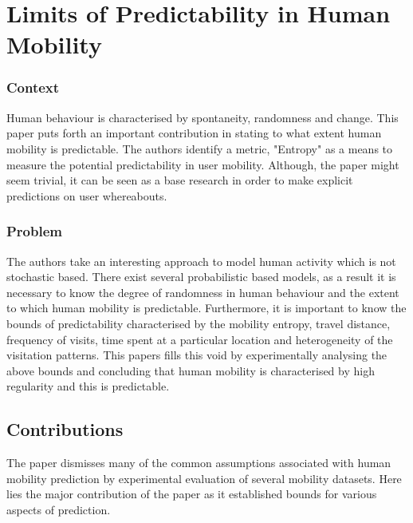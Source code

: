 \newpage
\section{Limits of Predictability in Human Mobility~\cite{Song1018}} \label{lect1}

\subsubsection*{Context}

Human behaviour is characterised by spontaneity, randomness and change. This paper puts
forth an important contribution in stating to what extent human mobility is predictable. 
The authors identify a metric, "Entropy" as a means to measure the potential predictability
in user mobility. Although, the paper might seem trivial, it can be seen as a base research
in order to make explicit predictions on user whereabouts. 

\subsubsection*{Problem}

The authors take an interesting approach to model human activity which is not stochastic 
based. There exist several probabilistic based models, as a result it is necessary to 
know the degree of randomness in human behaviour and the extent to which human mobility 
is predictable. Furthermore, it is important to know the bounds of predictability 
characterised by the mobility entropy, travel distance, frequency of visits, time spent 
at a particular location and heterogeneity of the visitation patterns. This papers fills this
void by experimentally analysing the above bounds and concluding that human mobility is 
characterised by high regularity and this is predictable.          

\subsection*{Contributions}

The paper dismisses many of the common assumptions associated with human mobility prediction
by experimental evaluation of several mobility datasets. Here lies the major contribution of 
the paper as it established bounds for various aspects of prediction. 

